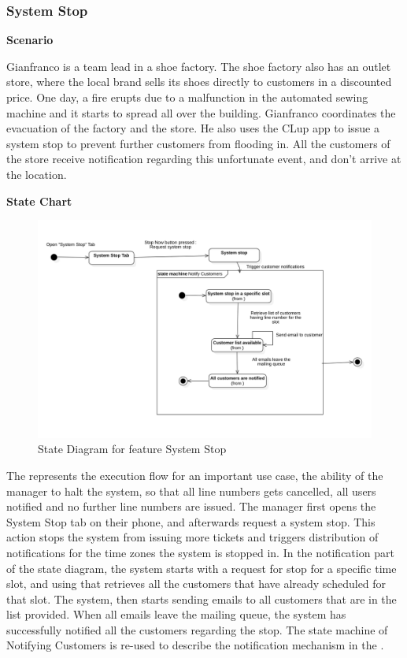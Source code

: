 \subsubsection{System Stop}

\textbf{Scenario}

Gianfranco is a team lead in a shoe factory.
The shoe factory also has an outlet store, where the local brand sells its shoes directly to customers in a discounted price.
One day, a fire erupts due to a malfunction in the automated sewing machine and it starts to spread all over the building.
Gianfranco coordinates the evacuation of the factory and the store.
He also uses the CLup app to issue a system stop to prevent further customers from flooding in.
All the customers of the store receive notification regarding this unfortunate event, and don't arrive at the location.

\textbf{State Chart}

\begin{figure}[H]
    \centering
    \includegraphics[height=0.4\textwidth]{Images/StateCharts/SystemStop.png}
    \caption{State Diagram for feature System Stop}
    \label{fig:SDSystemStop}
\end{figure}

The  represents the execution flow for an important use case, the ability of the manager to halt the system, so that all line numbers gets cancelled, all users notified and no further line numbers are issued.
The manager first opens the System Stop tab on their phone, and afterwards request a system stop.
This action stops the system from issuing more tickets and triggers distribution of notifications for the time zones the system is stopped in.
In the notification part of the state diagram, the system starts with a request for stop for a specific time slot, and using that retrieves all the customers that have already scheduled for that slot.
The system, then starts sending emails to all customers that are in the list provided.
When all emails leave the mailing queue, the system has successfully notified all the customers regarding the stop.
The state machine of Notifying Customers is re-used to describe the notification mechanism in the .

